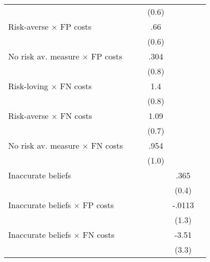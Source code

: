 \begin{table}[htbp]
\begin{tabular}{l*{5}{c}}
                &                  &                  &    (0.6)         &                  &                  \\
Risk-averse $\times$ FP costs&                  &                  &      .66         &                  &                  \\
                &                  &                  &    (0.6)         &                  &                  \\
No risk av. measure $\times$ FP costs&                  &                  &     .304         &                  &                  \\
                &                  &                  &    (0.8)         &                  &                  \\
Risk-loving $\times$ FN costs&                  &                  &      1.4\sym{*}  &                  &                  \\
                &                  &                  &    (0.8)         &                  &                  \\
Risk-averse $\times$ FN costs&                  &                  &     1.09         &                  &                  \\
                &                  &                  &    (0.7)         &                  &                  \\
No risk av. measure $\times$ FN costs&                  &                  &     .954         &                  &                  \\
                &                  &                  &    (1.0)         &                  &                  \\
Inaccurate beliefs&                  &                  &                  &     .365         &                  \\
                &                  &                  &                  &    (0.4)         &                  \\
Inaccurate beliefs $\times$ FP costs&                  &                  &                  &   -.0113         &                  \\
                &                  &                  &                  &    (1.3)         &                  \\
Inaccurate beliefs $\times$ FN costs&                  &                  &                  &    -3.51         &                  \\
                &                  &                  &                  &    (3.3)         &                  \\

\end{tabular}
\end{table}
